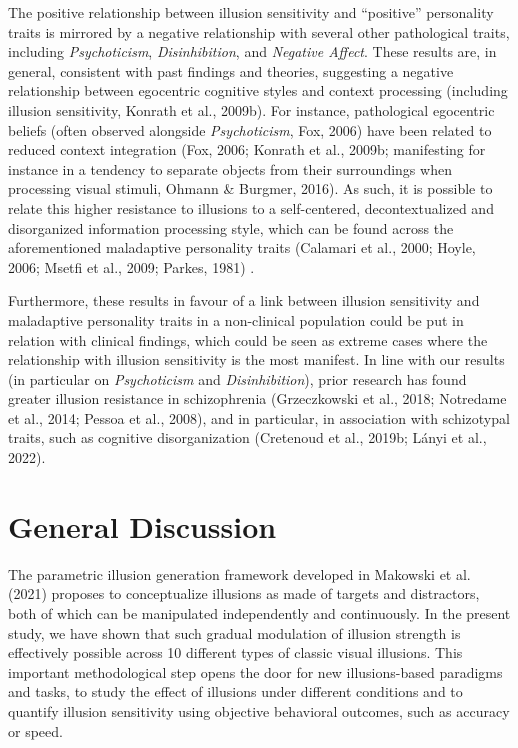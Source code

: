 \documentclass[
  man,floatsintext]{apa6}
\begin{document}
The positive relationship between illusion sensitivity and ``positive'' personality traits is mirrored by a negative relationship with several other pathological traits, including \emph{Psychoticism}, \emph{Disinhibition}, and \emph{Negative Affect}. These results are, in general, consistent with past findings and theories, suggesting a negative relationship between egocentric cognitive styles and context processing (including illusion sensitivity, Konrath et al., 2009b). For instance, pathological egocentric beliefs (often observed alongside \emph{Psychoticism}, Fox, 2006) have been related to reduced context integration (Fox, 2006; Konrath et al., 2009b; manifesting for instance in a tendency to separate objects from their surroundings when processing visual stimuli, Ohmann \& Burgmer, 2016). As such, it is possible to relate this higher resistance to illusions to a self-centered, decontextualized and disorganized information processing style, which can be found across the aforementioned maladaptive personality traits (Calamari et al., 2000; Hoyle, 2006; Msetfi et al., 2009; Parkes, 1981) .

Furthermore, these results in favour of a link between illusion sensitivity and maladaptive personality traits in a non-clinical population could be put in relation with clinical findings, which could be seen as extreme cases where the relationship with illusion sensitivity is the most manifest. In line with our results (in particular on \emph{Psychoticism} and \emph{Disinhibition}), prior research has found greater illusion resistance in schizophrenia (Grzeczkowski et al., 2018; Notredame et al., 2014; Pessoa et al., 2008), and in particular, in association with schizotypal traits, such as cognitive disorganization (Cretenoud et al., 2019b; Lányi et al., 2022).

\hypertarget{general-discussion}{%
\section{General Discussion}\label{general-discussion}}

The parametric illusion generation framework developed in Makowski et al. (2021) proposes to conceptualize illusions as made of targets and distractors, both of which can be manipulated independently and continuously. In the present study, we have shown that such gradual modulation of illusion strength is effectively possible across 10 different types of classic visual illusions. This important methodological step opens the door for new illusions-based paradigms and tasks, to study the effect of illusions under different conditions and to quantify illusion sensitivity using objective behavioral outcomes, such as accuracy or speed.
\end{document}

